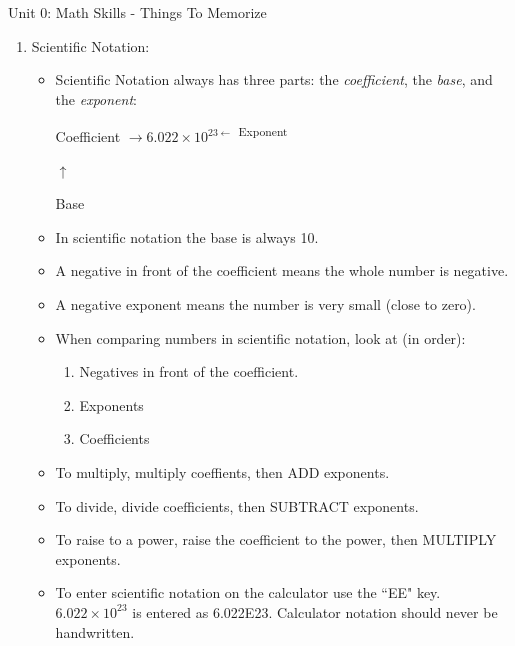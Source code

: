 \documentclass[letterpaper, 12pt]{article}
\newcommand{\assnum}{Unit 0: Math Skills}
\newcommand{\assname}{Things To Memorize}
\begin{document}
\fancyfoot[r]{\assnum}	


\begin{center} \assnum{} - \assname{}
\end{center}





\begin{enumerate}
	\item Scientific Notation:
		\begin{itemize}
			\item Scientific Notation always has three parts: the \textit{coefficient}, the \textit{base}, and the \textit{exponent}:
			\begin{center}
				Coefficient $\rightarrow 6.022 \times 10^{23 \leftarrow}$ \textsuperscript{Exponent}
				
				\hspace{.7in} $\uparrow$
				
				\hspace{.7in} Base
			\end{center}
		\item In scientific notation the base is always 10.
		\item A negative in front of the coefficient means the whole number is negative.
		\item A negative exponent means the number is very small (close to zero).	
		\item When comparing numbers in scientific notation, look at (in order): 
		\begin{enumerate}
			\item Negatives in front of the coefficient.
			\item Exponents
			\item Coefficients
		\end{enumerate}
	
	\item To multiply, multiply coeffients, then ADD exponents.
	\item To divide, divide coefficients, then SUBTRACT exponents.
	\item To raise to a power, raise the coefficient to the power, then MULTIPLY exponents.
	\item To enter scientific notation on the calculator use the ``EE" key. $6.022 \times 10^{23}$ is entered as 6.022\scriptsize E\normalsize23.  Calculator notation should never be handwritten. 
	\end{itemize}
	

\end{enumerate}
\end{document}
